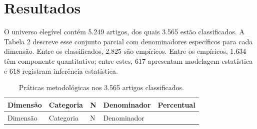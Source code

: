 \documentclass[
]{article}
\begin{document}
\section{Resultados}\label{resultados}

O universo elegível contém 5.249 artigos, dos quais 3.565 estão
classificados. A Tabela 2 descreve esse conjunto parcial com
denominadores específicos para cada dimensão. Entre os classificados,
2.825 são empíricos. Entre os empíricos, 1.634 têm componente
quantitativo; entre estes, 617 apresentam modelagem estatística e 618
registram inferência estatística.

\begin{longtable}[]{@{}
  >{\raggedright\arraybackslash}p{}
  >{\raggedright\arraybackslash}p{}
  >{\raggedright\arraybackslash}p{}
  >{\raggedright\arraybackslash}p{}
  >{\raggedright\arraybackslash}p{}@{}}
\caption{Práticas metodológicas nos 3.565 artigos
classificados.}\tabularnewline
\toprule\noalign{}
\begin{minipage}[b]{\linewidth}\raggedright
Dimensão
\end{minipage} & \begin{minipage}[b]{\linewidth}\raggedright
Categoria
\end{minipage} & \begin{minipage}[b]{\linewidth}\raggedright
N
\end{minipage} & \begin{minipage}[b]{\linewidth}\raggedright
Denominador
\end{minipage} & \begin{minipage}[b]{\linewidth}\raggedright
Percentual
\end{minipage} \\
\midrule\noalign{}
\endfirsthead
\toprule\noalign{}
\begin{minipage}[b]{\linewidth}\raggedright
Dimensão
\end{minipage} & \begin{minipage}[b]{\linewidth}\raggedright
Categoria
\end{minipage} & \begin{minipage}[b]{\linewidth}\raggedright
N
\end{minipage} & \begin{minipage}[b]{\linewidth}\raggedright
Denominador
\end{minipage} & \begin{minipage}[b]{\linewidth}\raggedright

\end{minipage}
\end{longtable}
\end{document}
